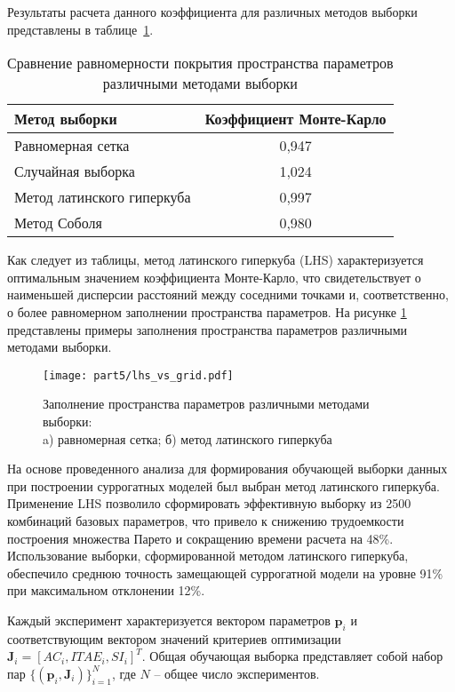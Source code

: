 Результаты расчета данного коэффициента для различных методов выборки представлены в таблице~\ref{tab:monte_carlo_coefficient}.

\begin{table}[ht]
	\centering
	\caption{Сравнение равномерности покрытия пространства параметров различными методами выборки}
	\label{tab:monte_carlo_coefficient}
    \small
	\begin{tabular}{lc}
		\midrule
		\textbf{Метод выборки}     & \textbf{Коэффициент Монте-Карло} \\
		\midrule
		Равномерная сетка          & 0,947                            \\
		Случайная выборка          & 1,024                            \\
		Метод латинского гиперкуба & 0,997                            \\
		Метод Соболя               & 0,980                            \\
		\midrule
	\end{tabular}
\end{table}

Как следует из таблицы, метод латинского гиперкуба (LHS) характеризуется
оптимальным значением коэффициента Монте-Карло,
что свидетельствует о наименьшей дисперсии расстояний между соседними точками и, соответственно,
о более равномерном заполнении пространства параметров. На рисунке \ref{fig:fill_field} представлены
примеры заполнения пространства параметров различными методами выборки.

\begin{figure}[ht]
	\centering
	\texttt{[image: part5/lhs\_vs\_grid.pdf]}
	\caption{Заполнение пространства параметров различными методами выборки:\\
		a) равномерная сетка; б) метод латинского гиперкуба}
	\label{fig:fill_field}
\end{figure}

На основе проведенного анализа для формирования обучающей выборки данных при построении
суррогатных моделей был выбран метод латинского гиперкуба.
Применение LHS позволило сформировать эффективную выборку из 2500 комбинаций базовых параметров, что
привело к снижению трудоемкости построения множества Парето и сокращению времени расчета на 48\%.
Использование выборки, сформированной методом латинского гиперкуба, обеспечило среднюю точность
замещающей суррогатной модели на уровне 91\% при максимальном отклонении 12\%.

Каждый эксперимент характеризуется вектором параметров $\mathbf{p}_i$ и соответствующим вектором
значений критериев оптимизации $\mathbf{J}_i = [AC_i, ITAE_i, SI_i]^T$. Общая обучающая выборка
представляет собой набор пар $\{(\mathbf{p}_i, \mathbf{J}_i)\}_{i=1}^N$, где $N$ -- общее число экспериментов.

